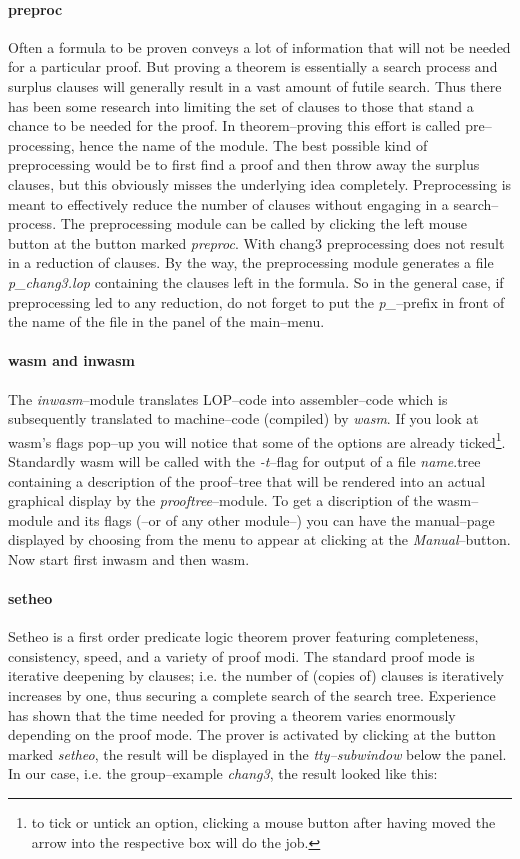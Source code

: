 \paragraph{preproc}
Often a formula to be proven conveys a lot of information that will not be needed for a
particular proof. But proving a theorem is essentially a search process and surplus clauses
will generally result in a vast amount of futile search. Thus there has been some research 
into limiting the set of clauses to those that stand a chance to be needed for the proof.
In theorem--proving this effort is called pre--processing, hence the name of the module.
The best possible kind of preprocessing would be to first find a proof and then throw away
the surplus clauses, but this obviously misses the underlying idea completely. Preprocessing
is meant to effectively reduce the number of clauses without engaging in a search--process.
The preprocessing module can be called by clicking the left mouse button at the button marked
{\it preproc\/}. With chang3 preprocessing does not result in a reduction of clauses.
By the way, the preprocessing module generates a file {\it p\_chang3.lop\/} containing the clauses left
in the formula. So in the general case, if preprocessing led to any reduction, do not forget
to put the {\it p\_\/}--prefix in front of the name of the file in the panel of the main--menu.
\paragraph{wasm and inwasm}
The {\it inwasm\/}--module translates LOP--code into assembler--code which is subsequently translated
to machine--code (compiled) by {\it wasm\/}.
If you look at wasm's flags pop--up you will notice that some of the options are already ticked\footnote
{to tick or untick an option, clicking a mouse button after having moved the arrow into
the respective box will do the job.}.
Standardly wasm will be called with the {\it -t\/}--flag for output of a file {\it name\/}.tree containing a
description of the proof--tree that will be rendered into an actual graphical display by the {\it prooftree\/}--module.
To get a discription of the wasm--module and its flags (--or of any other module--) you can have
the manual--page displayed by choosing from the menu to appear at clicking at the {\it Manual\/}--button.
Now start first inwasm and then wasm.
\paragraph{setheo}
Setheo is a first order predicate logic theorem prover featuring completeness, consistency, speed,
and a variety of proof modi. The standard proof mode is iterative deepening by clauses; i.e. the
number of (copies of) clauses is iteratively increases by one, thus securing a complete search of the search tree.
Experience has shown that the time needed for proving a theorem varies enormously depending on the
proof mode.
The prover is activated by clicking at the button marked {\it setheo\/}, the result will be displayed in the
{\it tty--subwindow\/} below the panel. In our case, i.e. the group--example {\it chang3\/}, the result looked like this:

